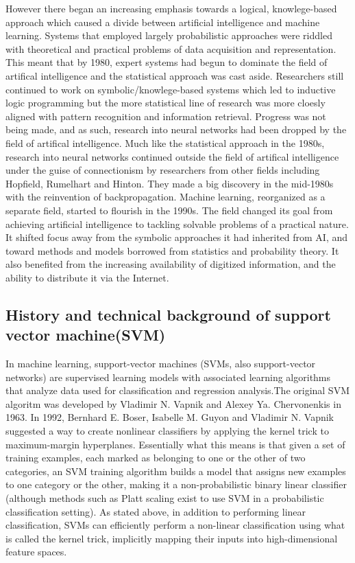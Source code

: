 However there began an increasing emphasis towards a logical, knowlege-based approach which caused a divide between artificial intelligence and machine learning. Systems that employed largely probabilistic approaches were riddled with theoretical and practical problems of data acquisition and representation. This meant that by 1980, expert systems had begun to dominate the field of artifical intelligence and the statistical approach was cast aside. Researchers still continued to work on symbolic/knowlege-based systems which led to inductive logic programming but the more statistical line of research was more cloesly aligned with pattern recognition and information retrieval. Progress was not being made, and as such, research into neural networks had been dropped by the field of artifical intelligence. Much like the statistical approach in the 1980s, research into neural networks continued outside the field of artifical intelligence under the guise of connectionism by researchers from other fields including Hopfield, Rumelhart and Hinton. They made a big discovery in the mid-1980s with the reinvention of backpropagation. Machine learning, reorganized as a separate field, started to flourish in the 1990s. The field changed its goal from achieving artificial intelligence to tackling solvable problems of a practical nature. It shifted focus away from the symbolic approaches it had inherited from AI, and toward methods and models borrowed from statistics and probability theory. It also benefited from the increasing availability of digitized information, and the ability to distribute it via the Internet.

\subsection{History and technical background of support vector machine(SVM)}
In machine learning, support-vector machines (SVMs, also support-vector networks) are supervised learning models with associated learning algorithms that analyze data used for classification and regression analysis.The original SVM algoritm was developed by Vladimir N. Vapnik and Alexey Ya. Chervonenkis in 1963. In 1992, Bernhard E. Boser, Isabelle M. Guyon and Vladimir N. Vapnik suggested a way to create nonlinear classifiers by applying the kernel trick to maximum-margin hyperplanes. Essentially what this means is that given a set of training examples, each marked as belonging to one or the other of two categories, an SVM training algorithm builds a model that assigns new examples to one category or the other, making it a non-probabilistic binary linear classifier (although methods such as Platt scaling exist to use SVM in a probabilistic classification setting). As stated above, in addition to performing linear classification, SVMs can efficiently perform a non-linear classification using what is called the kernel trick, implicitly mapping their inputs into high-dimensional feature spaces.



